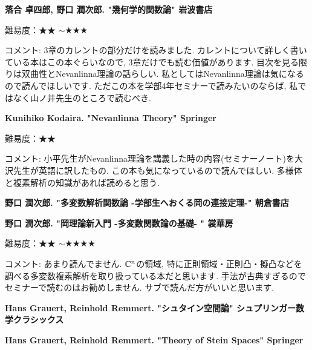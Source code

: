 \vspace{8pt}


\textbf{落合 卓四郎, 野口 潤次郎. "幾何学的関数論" 岩波書店}  　\vspace{-6pt} 

難易度：★★ $\sim$★★★ 　\vspace{-6pt} 

コメント: 3章のカレントの部分だけを読みました. カレントについて詳しく書いている本はこの本ぐらいなので, 3章だけでも読む価値があります. 目次を見る限りは双曲性とNevanlinna理論の話らしい. 私としてはNevanlinna理論は気になるので読んでほしいです. ただこの本を学部4年セミナーで読みたいのならば, 私ではなく山ノ井先生のところで読むべき.
\vspace{8pt}

\textbf{Kunihiko Kodaira. "Nevanlinna Theory" Springer}  　\vspace{-6pt} 

難易度：★★ 　\vspace{-6pt} 

コメント: 小平先生がNevanlinna理論を講義した時の内容(セミナーノート)を大沢先生が英語に訳したもの. この本も気になっているので読んでほしい. 多様体と複素解析の知識があれば読めると思う. 
\vspace{8pt}

\textbf{野口 潤次郎. "多変数解析関数論 -学部生へおくる岡の連接定理-" 朝倉書店}  　\vspace{-6pt} 

\textbf{野口 潤次郎. "岡理論新入門 -多変数関数論の基礎- "  裳華房}  　\vspace{-6pt} 

難易度：★★ $\sim$★★★★ 　\vspace{-6pt} 

コメント: あまり読んでません. $\mathbb{C}^n$の領域, 特に正則領域・正則凸・擬凸などを調べる多変数複素解析を取り扱っている本だと思います. 手法が古典すぎるのでセミナーで読むのはお勧めしません. サブで読んだ方がいいと思います.
 \vspace{8pt}

\textbf{Hans Grauert, Reinhold Remmert. "シュタイン空間論" シュプリンガー数学クラシックス}  　\vspace{-6pt} 

\textbf{Hans Grauert, Reinhold Remmert. "Theory of Stein Spaces" Springer }  　\vspace{-6pt} 

